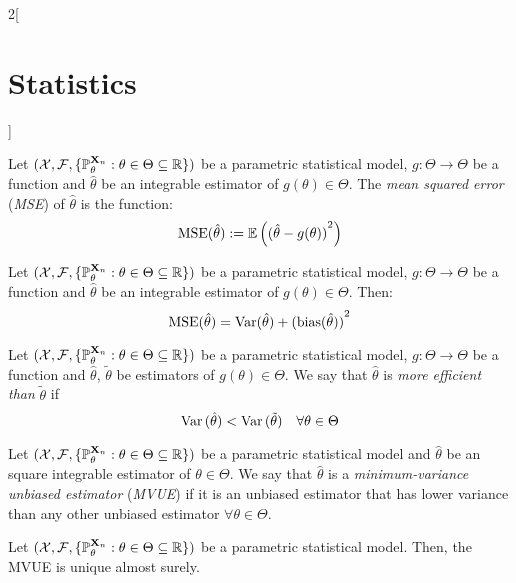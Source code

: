 \documentclass[../../../main.tex]{subfiles}
\begin{document}
\begin{multicols}{2}[\section{Statistics}]
\begin{definition}
    Let $(\mathcal{X},\mathcal{F},\{\mathbb{P}_{\theta}^{\boldsymbol{\mathrm{X}}_n}:{\theta}\in\Theta\subseteq \mathbb{R}\})$ be a parametric statistical model, $g:\Theta\rightarrow\Theta$ be a function and ${\hat\theta}$ be an integrable estimator of $g({\theta})\in\Theta$. The \emph{mean squared error} (\emph{MSE}) of ${\hat\theta}$ is the function: $$\operatorname{MSE}({\hat\theta}):=\mathbb{E}\left({({\hat\theta}-g({\theta}))}^2\right)$$
  \end{definition}
  \begin{proposition}
    Let $(\mathcal{X},\mathcal{F},\{\mathbb{P}_{\theta}^{\boldsymbol{\mathrm{X}}_n}:{\theta}\in\Theta\subseteq \mathbb{R}\})$ be a parametric statistical model, $g:\Theta\rightarrow\Theta$ be a function and ${\hat\theta}$ be an integrable estimator of $g({\theta})\in\Theta$. Then: $$\operatorname{MSE}({\hat\theta})=\operatorname{Var}({\hat\theta})+{(\operatorname{bias}({\hat\theta}))}^2$$
  \end{proposition}
  \begin{definition}
    Let $(\mathcal{X},\mathcal{F},\{\mathbb{P}_{\theta}^{\boldsymbol{\mathrm{X}}_n}:{\theta}\in\Theta\subseteq \mathbb{R}\})$ be a parametric statistical model, $g:\Theta\rightarrow\Theta$ be a function and ${\hat\theta}$, ${\tilde\theta}$ be estimators of $g({\theta})\in\Theta$. We say that ${\hat\theta}$ is \emph{more efficient than} ${\tilde\theta}$ if $$\operatorname{Var}{({\hat\theta})}<\operatorname{Var}{({\tilde\theta})}\quad\forall{\theta}\in\Theta$$
  \end{definition}
  \begin{definition}
    Let $(\mathcal{X},\mathcal{F},\{\mathbb{P}_{\theta}^{\boldsymbol{\mathrm{X}}_n}:{\theta}\in\Theta\subseteq \mathbb{R}\})$ be a parametric statistical model and ${\hat\theta}$ be an square integrable estimator of ${\theta}\in\Theta$. We say that ${\hat\theta}$ is a \emph{minimum-variance unbiased estimator} (\emph{MVUE}) if it is an unbiased estimator that has lower variance than any other unbiased estimator $\forall {\theta}\in\Theta$.
  \end{definition}
  \begin{proposition}
    Let $(\mathcal{X},\mathcal{F},\{\mathbb{P}_{\theta}^{\boldsymbol{\mathrm{X}}_n}:{\theta}\in\Theta\subseteq \mathbb{R}\})$ be a parametric statistical model. Then, the MVUE is unique almost surely.
  \end{proposition}

\end{multicols}
\end{document}
